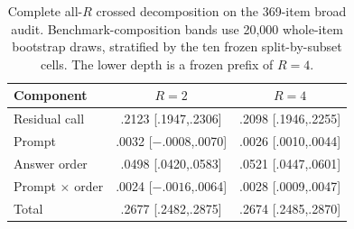 \begin{table}[t]
\centering
\small
\begin{tabular}{lcc}
\toprule
Component & $R=2$ & $R=4$ \\
\midrule
Residual call
  & .2123 [.1947,.2306] & .2098 [.1946,.2255] \\
Prompt
  & .0032 [$-.0008$,.0070] & .0026 [.0010,.0044] \\
Answer order
  & .0498 [.0420,.0583] & .0521 [.0447,.0601] \\
Prompt $\times$ order
  & .0024 [$-.0016$,.0064] & .0028 [.0009,.0047] \\
Total
  & .2677 [.2482,.2875] & .2674 [.2485,.2870] \\
\bottomrule
\end{tabular}
\caption{Complete all-$R$ crossed decomposition on the 369-item broad audit.
Benchmark-composition bands use 20,000 whole-item bootstrap draws, stratified by the ten frozen
split-by-subset cells. The lower depth is a frozen prefix of $R=4$.}
\label{tab:supp_broad_decomposition}
\end{table}
